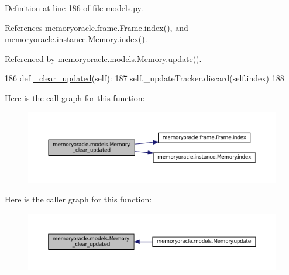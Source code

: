 Definition at line 186 of file models.\+py.



References memoryoracle.\+frame.\+Frame.\+index(), and memoryoracle.\+instance.\+Memory.\+index().



Referenced by memoryoracle.\+models.\+Memory.\+update().


\begin{DoxyCode}
186     \textcolor{keyword}{def }\hyperlink{classmemoryoracle_1_1models_1_1Memory_a253756ba0ddd58fc05a9463c0a181185}{\_clear\_updated}(self):
187         self.\_updateTracker.discard(self.index)
188 
\end{DoxyCode}


Here is the call graph for this function\+:
\nopagebreak
\begin{figure}[H]
\begin{center}
\leavevmode
\includegraphics[width=350pt]{classmemoryoracle_1_1models_1_1Memory_a253756ba0ddd58fc05a9463c0a181185_cgraph}
\end{center}
\end{figure}




Here is the caller graph for this function\+:\nopagebreak
\begin{figure}[H]
\begin{center}
\leavevmode
\includegraphics[width=350pt]{classmemoryoracle_1_1models_1_1Memory_a253756ba0ddd58fc05a9463c0a181185_icgraph}
\end{center}
\end{figure}


\hypertarget{classmemoryoracle_1_1models_1_1Memory_a71e772c88d2638ee6bff1f0615852cff}{}
